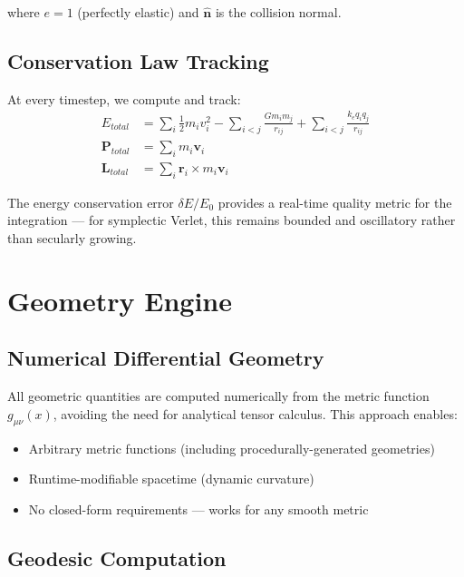 \documentclass[12pt, a4paper]{article}
\begin{document}
where $e = 1$ (perfectly elastic) and $\hat{\mathbf{n}}$ is the collision normal.

\subsection{Conservation Law Tracking}

At every timestep, we compute and track:
\begin{align}
    E_{total} &= \sum_i \frac{1}{2}m_i v_i^2
        - \sum_{i<j} \frac{G m_i m_j}{r_{ij}}
        + \sum_{i<j} \frac{k_e q_i q_j}{r_{ij}} \\
    \mathbf{P}_{total} &= \sum_i m_i \mathbf{v}_i \\
    \mathbf{L}_{total} &= \sum_i \mathbf{r}_i \times m_i \mathbf{v}_i
\end{align}

The energy conservation error $\delta E / E_0$ provides a real-time quality
metric for the integration — for symplectic Verlet, this remains bounded and
oscillatory rather than secularly growing.

\section{Geometry Engine}
\label{sec:geometry}

\subsection{Numerical Differential Geometry}

All geometric quantities are computed numerically from the metric function
$g_{\mu\nu}(x)$, avoiding the need for analytical tensor calculus. This
approach enables:

\begin{itemize}
    \item Arbitrary metric functions (including procedurally-generated geometries)
    \item Runtime-modifiable spacetime (dynamic curvature)
    \item No closed-form requirements — works for any smooth metric
\end{itemize}

\subsection{Geodesic Computation}
\end{document}

